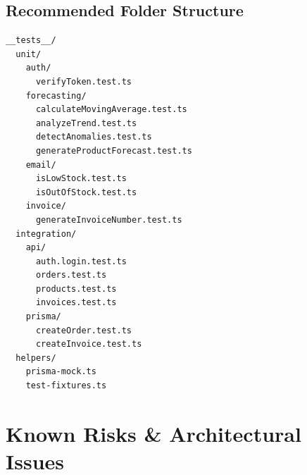 \documentclass[12pt,a4paper]{report}
\begin{document}
\section{Recommended Folder Structure}

\begin{lstlisting}[caption={Test folder structure}]
__tests__/
  unit/
    auth/
      verifyToken.test.ts
    forecasting/
      calculateMovingAverage.test.ts
      analyzeTrend.test.ts
      detectAnomalies.test.ts
      generateProductForecast.test.ts
    email/
      isLowStock.test.ts
      isOutOfStock.test.ts
    invoice/
      generateInvoiceNumber.test.ts
  integration/
    api/
      auth.login.test.ts
      orders.test.ts
      products.test.ts
      invoices.test.ts
    prisma/
      createOrder.test.ts
      createInvoice.test.ts
  helpers/
    prisma-mock.ts
    test-fixtures.ts
\end{lstlisting}

\chapter{Known Risks \& Architectural Issues}
\end{document}
